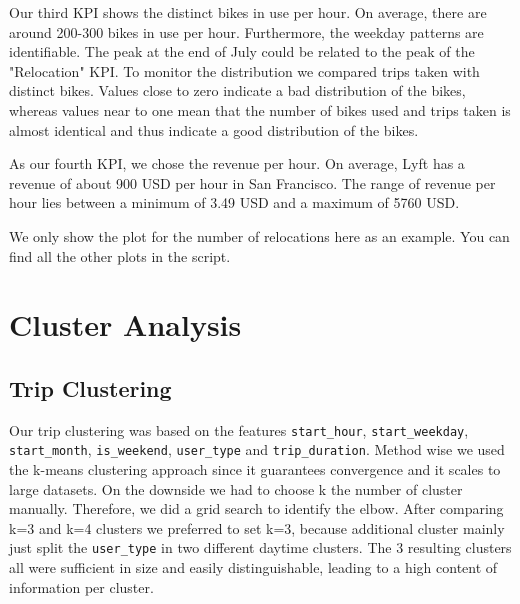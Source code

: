 Our third KPI shows the distinct bikes in use per hour. On average, there are around 200-300 bikes in use per hour. Furthermore, the weekday patterns are identifiable. The peak at the end of July could be related to the peak of the "Relocation" KPI. To monitor the distribution we compared trips taken with distinct bikes. Values close to zero indicate a bad distribution of the bikes, whereas values near to one mean that the number of bikes used and trips taken is almost identical and thus indicate a good distribution of the bikes.

As our fourth KPI, we chose the revenue per hour. On average, Lyft has a revenue of about 900 USD per hour in San Francisco. The range of revenue per hour lies between a minimum of 3.49 USD and a maximum of 5760 USD. 

We only show the plot for the number of relocations here as an example. You can find all the other plots in the script.
\section{Cluster Analysis}

\subsection{Trip Clustering} 
Our trip clustering was based on the features \texttt{start\_hour}, \texttt{start\_weekday}, \texttt{start\_month}, \texttt{is\_weekend}, \texttt{user\_type} and  \texttt{trip\_duration}. Method wise we used the k-means clustering approach since it guarantees convergence and it 
scales to large datasets. On the downside we had to choose k the number of cluster manually. Therefore, we did a grid search to identify the elbow. After comparing k=3 and k=4 clusters we preferred to set k=3, because additional cluster mainly just split the \texttt{user\_type} in two different daytime clusters. The 3 resulting clusters all were sufficient in size and easily distinguishable, leading to a high content of information per cluster.


